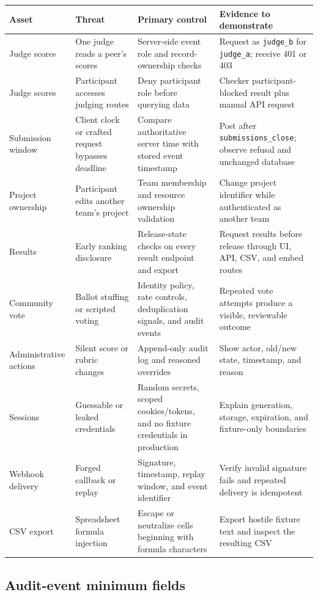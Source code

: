 \documentclass[11pt]{article}
\begin{document}
\begin{longtable}{@{}L{31mm}L{38mm}L{43mm}L{46mm}@{}}
\toprule
\textbf{Asset} & \textbf{Threat} & \textbf{Primary control} & \textbf{Evidence to demonstrate}\\
\midrule
\endhead%
Judge scores & One judge reads a peer's scores & Server-side event role and record-ownership checks & Request as \texttt{judge\_b} for \texttt{judge\_a}; receive 401 or 403\\
Judge scores & Participant accesses judging routes & Deny participant role before querying data & Checker participant-blocked result plus manual API request\\
Submission window & Client clock or crafted request bypasses deadline & Compare authoritative server time with stored event timestamp & Post after \texttt{submissions\_close}; observe refusal and unchanged database\\
Project ownership & Participant edits another team's project & Team membership and resource ownership validation & Change project identifier while authenticated as another team\\
Results & Early ranking disclosure & Release-state checks on every result endpoint and export & Request results before release through UI, API, CSV, and embed routes\\
Community vote & Ballot stuffing or scripted voting & Identity policy, rate controls, deduplication signals, and audit events & Repeated vote attempts produce a visible, reviewable outcome\\
Administrative actions & Silent score or rubric changes & Append-only audit log and reasoned overrides & Show actor, old/new state, timestamp, and reason\\
Sessions & Guessable or leaked credentials & Random secrets, scoped cookies/tokens, and no fixture credentials in production & Explain generation, storage, expiration, and fixture-only boundaries\\
Webhook delivery & Forged callback or replay & Signature, timestamp, replay window, and event identifier & Verify invalid signature fails and repeated delivery is idempotent\\
CSV export & Spreadsheet formula injection & Escape or neutralize cells beginning with formula characters & Export hostile fixture text and inspect the resulting CSV\\
\bottomrule
\end{longtable}

\subsection{Audit-event minimum fields}
\end{document}
